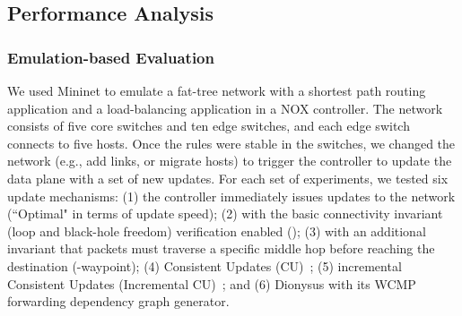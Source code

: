 \subsection{Performance Analysis}
\label{sec:parallel}

\subsubsection{Emulation-based Evaluation}

We used Mininet to emulate a fat-tree network with a shortest path routing application and a load-balancing application in a NOX controller. The network consists of five core switches
and ten edge switches, and each edge switch connects to five hosts. %
Once the rules were stable in the switches, we changed the network (e.g., add links, or migrate hosts) to trigger the controller to update the data plane with a set of new updates. %
For each set of experiments, we tested six update mechanisms: (1) the controller immediately issues updates to the network (``Optimal" in terms of update speed); (2) \name with the basic connectivity invariant (loop and black-hole freedom) verification enabled (\name); (3) \name with an additional invariant that packets must traverse a specific middle hop before reaching the destination (\name-waypoint); (4) Consistent Updates (CU)~\cite{Reitblatt2012}; (5) incremental Consistent Updates (Incremental CU)~\cite{incremental-cu}; and (6) Dionysus \cite{jin2014dynamic} with its WCMP forwarding dependency graph generator.

